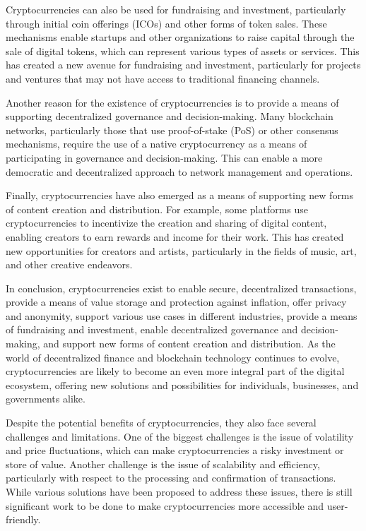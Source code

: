 \documentclass[a4paper, 10pt]{article}
\begin{document}
Cryptocurrencies can also be used for fundraising and investment, particularly through initial coin offerings (ICOs) and other forms of token sales. These mechanisms enable startups and other organizations to raise capital through the sale of digital tokens, which can represent various types of assets or services. This has created a new avenue for fundraising and investment, particularly for projects and ventures that may not have access to traditional financing channels.

Another reason for the existence of cryptocurrencies is to provide a means of supporting decentralized governance and decision-making. Many blockchain networks, particularly those that use proof-of-stake (PoS) or other consensus mechanisms, require the use of a native cryptocurrency as a means of participating in governance and decision-making. This can enable a more democratic and decentralized approach to network management and operations.

Finally, cryptocurrencies have also emerged as a means of supporting new forms of content creation and distribution. For example, some platforms use cryptocurrencies to incentivize the creation and sharing of digital content, enabling creators to earn rewards and income for their work. This has created new opportunities for creators and artists, particularly in the fields of music, art, and other creative endeavors.

In conclusion, cryptocurrencies exist to enable secure, decentralized transactions, provide a means of value storage and protection against inflation, offer privacy and anonymity, support various use cases in different industries, provide a means of fundraising and investment, enable decentralized governance and decision-making, and support new forms of content creation and distribution. As the world of decentralized finance and blockchain technology continues to evolve, cryptocurrencies are likely to become an even more integral part of the digital ecosystem, offering new solutions and possibilities for individuals, businesses, and governments alike.

Despite the potential benefits of cryptocurrencies, they also face several challenges and limitations. One of the biggest challenges is the issue of volatility and price fluctuations, which can make cryptocurrencies a risky investment or store of value. Another challenge is the issue of scalability and efficiency, particularly with respect to the processing and confirmation of transactions. While various solutions have been proposed to address these issues, there is still significant work to be done to make cryptocurrencies more accessible and user-friendly.
\end{document}
